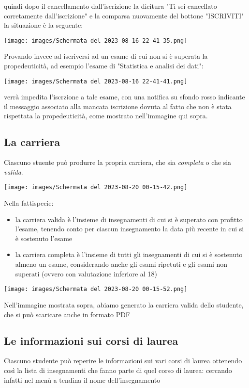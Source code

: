 \documentclass{article}
\begin{document}
    quindi dopo il cancellamento dall'iscrizione la dicitura "Ti sei cancellato corretamente dall'iscrizione" e la comparsa nuovamente del bottone "ISCRIVITI" la situazione è la seguente:

    \texttt{[image: images/Schermata del 2023-08-16 22-41-35.png]}

    Provando invece ad iscriversi ad un esame di cui non si è superata la propedeuticità, ad esempio l'esame di "Statistica e analisi dei dati":

    \texttt{[image: images/Schermata del 2023-08-16 22-41-41.png]}

    verrà impedita l'iscrzione a tale esame, con una notifica su sfondo rosso indicante il messaggio associato alla mancata iscrizione dovuta al fatto che non è stata rispettata la propedeuticità, come mostrato nell'immagine qui sopra.

    \subsection{La carriera}
    Ciascuno stuente può produrre la propria carriera, che sia \textit{completa} o che sia \textit{valida}.

    \texttt{[image: images/Schermata del 2023-08-20 00-15-42.png]}

    Nella fattispecie:
    \begin{itemize}
        \item la carriera valida è l'insieme di insegnamenti di cui si è superato con profitto l'esame, tenendo conto per ciascun insegnamento la data più recente in cui si è sostenuto l'esame
        \item  la carriera completa è l'insieme di tutti gli insegnamenti di cui si è sostenuto almeno un esame, considerando anche gli esami ripetuti e gli esami non superati (ovvero con valutazione inferiore al 18)
    \end{itemize}

    \texttt{[image: images/Schermata del 2023-08-20 00-15-52.png]}

    Nell'immagine mostrata sopra, abiamo generato la carriera valida dello studente, che si può scaricare anche in formato PDF

    \subsection{Le informazioni sui corsi di laurea}
    Ciascuno studente può reperire le informazioni sui vari corsi di laurea ottenendo così la lista di insegnamenti che fanno parte di quel corso di laurea: cercando infatti nel menù a tendina il nome dell'insegnamento
\end{document}
